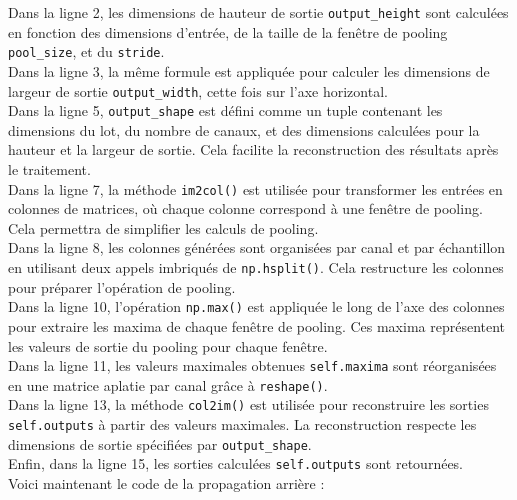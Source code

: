 \begin{multicols}{2}
Dans la ligne 2, les dimensions de hauteur de sortie \texttt{output\_height} sont 
calculées en fonction des dimensions d’entrée, de la taille de la fenêtre de pooling 
\texttt{pool\_size}, et du \texttt{stride}. \\

Dans la ligne 3, la même formule est appliquée pour calculer les dimensions de largeur de sortie 
\texttt{output\_width}, cette fois sur l’axe horizontal. \\

Dans la ligne 5, \texttt{output\_shape} est défini comme 
un tuple contenant les dimensions du lot, du nombre de canaux, 
et des dimensions calculées pour la hauteur et la largeur de sortie. Cela facilite 
la reconstruction des résultats après le traitement. \\

Dans la ligne 7, la méthode \texttt{im2col()} est utilisée pour transformer 
les entrées en colonnes de matrices, où chaque colonne correspond à une fenêtre de 
pooling. Cela permettra de simplifier les calculs de pooling. \\

Dans la ligne 8, les colonnes générées sont organisées par canal et par 
échantillon en utilisant deux appels imbriqués de \texttt{np.hsplit()}. 
Cela restructure les colonnes pour préparer l’opération de pooling. \\

Dans la ligne 10, l’opération \texttt{np.max()} est appliquée le long de 
l’axe des colonnes pour extraire les maxima de chaque fenêtre de pooling. Ces maxima 
représentent les valeurs de sortie du pooling pour chaque fenêtre. \\

Dans la ligne 11, les valeurs maximales obtenues \texttt{self.maxima} sont 
réorganisées en une matrice aplatie par canal grâce à \texttt{reshape()}. \\

Dans la ligne 13, la méthode \texttt{col2im()} est utilisée pour reconstruire les 
sorties \texttt{self.outputs} à partir des valeurs maximales. La reconstruction 
respecte les dimensions de sortie spécifiées par \texttt{output\_shape}. \\

Enfin, dans la ligne 15, les sorties calculées \texttt{self.outputs} sont retournées. \\

Voici maintenant le code de la propagation arrière : \\


\end{multicols}
